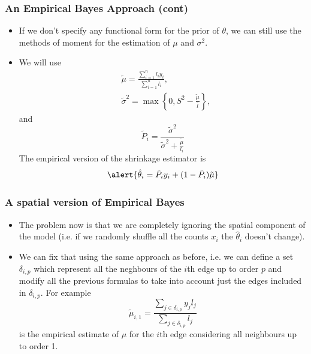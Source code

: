 \documentclass[c,10pt,pdftex]{beamer}
\begin{document}
\begin{frame}
\frametitle{An Empirical Bayes Approach (cont)}
\vspace{-0.75cm}
\begin{itemize}
	\setlength\itemsep{1em}
	\item If we don't specify any functional form for the prior of $\theta$, we can still use the methods of moment for the estimation of $\mu$ and $\sigma^2$. 
	
	\item We will use
	\[
	\begin{split}
		& \tilde{\mu} = \frac{\sum_{i=1}^{n} l_iy_i}{\sum_{i=1}^n l_i}, \\
		& \tilde{\sigma}^2 = \max\left\lbrace 0, S^2 - \frac{\tilde{\mu}}{\bar{l}}\right\rbrace,
	\end{split}
	\]
	and
	\[
	\tilde{P}_i = \frac{\tilde{\sigma}^2}{\tilde{\sigma}^2 + \frac{\tilde{\mu}}{l_i}} 
	\]
	The empirical version of the shrinkage estimator is
	\[
	\alert{\hat{\theta}_i = \tilde{P}_iy_i + (1 - \tilde{P}_i)\tilde{\mu}}
	\]
\end{itemize}
\end{frame}

\begin{frame}
\frametitle{A spatial version of Empirical Bayes}
\vspace{-0.75cm}
\begin{itemize}
	\setlength\itemsep{1em}
	\item The problem now is that \alert{we are completely ignoring the spatial component of the model} (i.e. if we randomly shuffle all the counts $x_i$ the $\hat{\theta}_i$ doesn't change). 
	
	\item We can fix that using the same approach as before, i.e. we can define a set $\delta_{i, p}$ which represent all the neghbours of the $i$th edge up to order $p$ and \alert{modify all the previous formulas to take into account just the edges included in $\delta_{i, p}$}. For example
	\[
	\tilde{\mu}_{i, 1} = \frac{\sum_{j \in \delta_{i, p}} y_jl_j}{\sum_{j \in \delta_{i, p}} l_j}
	\]
	is the empirical estimate of $\mu$ for the $i$th edge considering all neighbours up to order 1. 
\end{itemize}
\end{frame}
\end{document}
